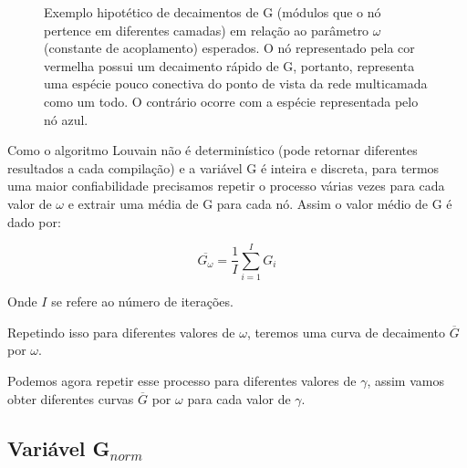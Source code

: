 \documentclass[
  12pt,
]{article}
\begin{document}
\begin{figure}[H] 
\centering
\setlength{\fboxsep}{0pt}%
\setlength{\fboxrule}{0.25pt}%
\caption{Exemplo hipotético de decaimentos de G (módulos que o nó pertence em diferentes camadas) em relação ao parâmetro $\omega$ (constante de acoplamento) esperados. O nó representado pela cor vermelha possui um decaimento rápido de G, portanto, representa uma espécie pouco conectiva do ponto de vista da rede multicamada como um todo. O contrário ocorre com a espécie representada pelo nó azul.}
\label{fig:Exemplo_decai}
\end{figure}

Como o algoritmo Louvain não é determinístico (pode retornar diferentes
resultados a cada compilação) e a variável G é inteira e discreta, para
termos uma maior confiabilidade precisamos repetir o processo várias
vezes para cada valor de \(\omega\) e extrair uma média de G para cada
nó. Assim o valor médio de G é dado por:

\begin{equation} \label{eq:3}
    \overline{G_{\omega}} = \frac{1}{I} \sum_{i=1}^{I} G_{i}
\end{equation}

Onde \(I\) se refere ao número de iterações.

Repetindo isso para diferentes valores de \(\omega\), teremos uma curva
de decaimento \(\overline{G}\) por \(\omega\).

Podemos agora repetir esse processo para diferentes valores de
\(\gamma\), assim vamos obter diferentes curvas \(\overline{G}\) por
\(\omega\) para cada valor de \(\gamma\).

\hypertarget{variuxe1vel-g_norm}{%
\subsection{\texorpdfstring{Variável
G\(_{norm}\)}{Variável G\_\{norm\}}}\label{variuxe1vel-g_norm}}
\end{document}
